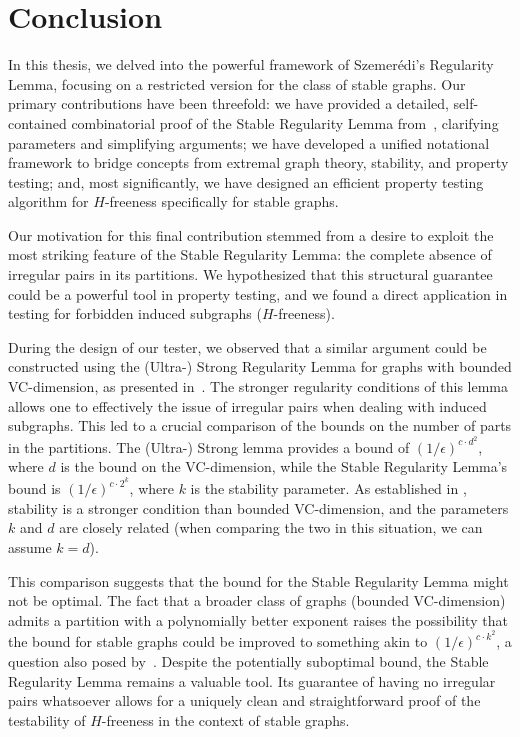 \section{Conclusion} \label{sec:conclusion}
    In this thesis, we delved into the powerful framework of Szemerédi's Regularity Lemma,
    focusing on a restricted version for the class of stable graphs.
    Our primary contributions have been threefold: we have provided a detailed, self-contained combinatorial proof of the Stable
    Regularity Lemma from~\cite{regularity_lemmas_for_stable_graphs}, clarifying parameters and simplifying arguments;
    we have developed a unified notational framework to bridge concepts from extremal graph theory, stability,
    and property testing; and, most significantly, we have designed an efficient property testing algorithm for
    $H$-freeness specifically for stable graphs.

    Our motivation for this final contribution stemmed from a desire to exploit the most striking feature of the Stable
    Regularity Lemma: the complete absence of irregular pairs in its partitions.
    We hypothesized that this structural guarantee could be a powerful tool in property testing, and we found a
    direct application in testing for forbidden induced subgraphs ($H$-freeness).

    During the design of our tester, we observed that a similar argument could be constructed using the
    \mbox{(Ultra-)} Strong Regularity Lemma for graphs with bounded VC-dimension, as presented
    in~\cite{regularity_partitions_and_the_topology_of_graphons}.
    The stronger regularity conditions of this lemma allows one to effectively  the issue of irregular
    pairs when dealing with induced subgraphs.
    This led to a crucial comparison of the bounds on the number of parts in the partitions.
    The (Ultra-) Strong lemma provides a bound of $(1/\epsilon)^{c \cdot d^2}$, where $d$ is the bound on the VC-dimension,
    while the Stable Regularity Lemma's bound is $(1/\epsilon)^{c \cdot 2^k}$, where $k$ is the stability parameter.
    As established in , stability is a stronger condition than bounded VC-dimension,
    and the parameters $k$ and $d$ are closely related (when comparing the two in this situation, we can assume $k=d$).

    This comparison suggests that the bound for the Stable Regularity Lemma might not be optimal.
    The fact that a broader class of graphs (bounded VC-dimension) admits a partition with a polynomially better
    exponent raises the possibility that the bound for stable graphs could be improved to something akin to
    $(1/\epsilon)^{c \cdot k^2}$, a question also posed by~\cite{julia_wolf_private_comunication}.
    Despite the potentially suboptimal bound, the Stable Regularity Lemma remains a valuable tool.
    Its guarantee of having no irregular pairs whatsoever allows for a uniquely clean and straightforward
    proof of the testability of $H$-freeness in the context of stable graphs.

